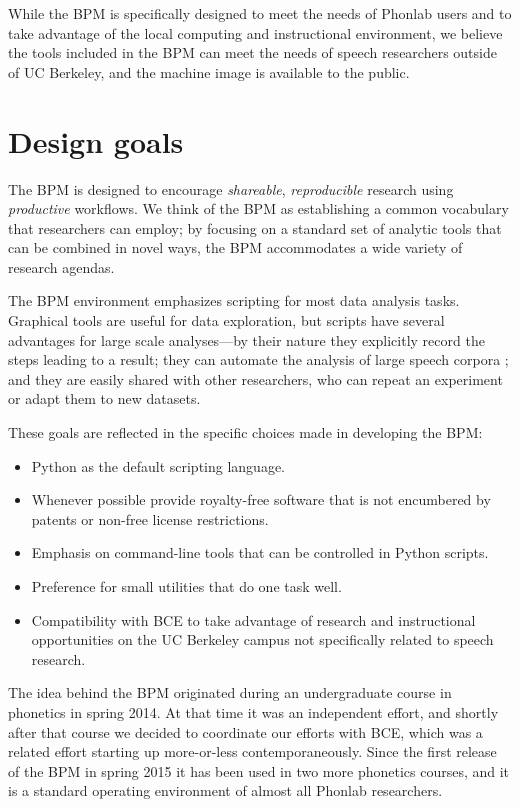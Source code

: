 \documentclass[a4paper]{article}
\begin{document}
    While the BPM is specifically designed to meet the needs of Phonlab users and to take advantage of the local computing and instructional environment, we believe the tools included in the BPM can meet the needs of speech researchers outside of UC Berkeley, and the machine image is available to the public.

  \section{Design goals}

    The BPM is designed to encourage {\em shareable}, {\em reproducible} research using {\em productive} workflows. We think of the BPM as establishing a common vocabulary that researchers can employ; by focusing on a standard set of analytic tools that can be combined in novel ways, the BPM accommodates a wide variety of research agendas.

    The BPM environment emphasizes scripting for most data analysis tasks. Graphical tools are useful for data exploration, but scripts have several advantages for large scale analyses---by their nature they explicitly record the steps leading to a result; they can automate the analysis of large speech corpora \cite{rlpc}; and they are easily shared with other researchers, who can repeat an experiment or adapt them to new datasets.

    These goals are reflected in the specific choices made in developing the BPM:

      \begin{itemize}
        \item Python as the default scripting language.
        \item Whenever possible provide royalty-free software that is not encumbered by patents or non-free license restrictions.
        \item Emphasis on command-line tools that can be controlled in Python scripts.
        \item Preference for small utilities that do one task well.
        \item Compatibility with BCE to take advantage of research and instructional opportunities on the UC Berkeley campus not specifically related to speech research.

      \end{itemize}

    The idea behind the BPM originated during an undergraduate course in phonetics in spring 2014. At that time it was an independent effort, and shortly after that course we decided to coordinate our efforts with BCE, which was a related effort starting up more-or-less contemporaneously. Since the first release of the BPM in spring 2015 it has been used in two more phonetics courses, and it is a standard operating environment of almost all Phonlab researchers.
  
\end{document}
